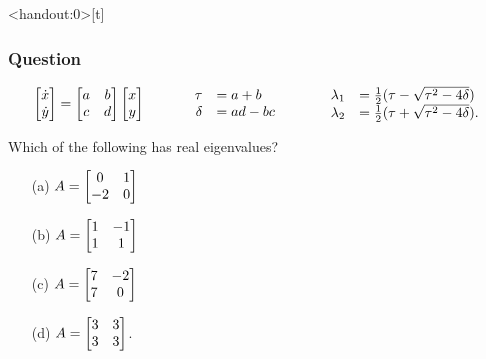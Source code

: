 \documentclass[9pt]{beamer}
\begin{document}
\begin{frame}<handout:0>[t]
 \frametitle{Question}
 \[ \left[\begin{matrix} \dot{x}\\ \dot{y}\end{matrix}\right]=\left[\begin{matrix} a&b\\ c&d\end{matrix}\right]\left[\begin{matrix} x\\ y\end{matrix}\right]
    \hspace{3em}
    \begin{array}{rl}
     \tau &= a+b \\ \delta &= ad-bc
    \end{array}
    \hspace{3em}
    \begin{array}{rl}
     \lambda_1 &= \tfrac{1}{2}(\tau - \sqrt{\tau^2-4\delta}) \\
     \lambda_2 &= \tfrac{1}{2}(\tau + \sqrt{\tau^2-4\delta}).
    \end{array}
 \]

 \reminderbar
 Which of the following has real eigenvalues?
 \begin{itemize}
  \item[(a)] $A=\left[\begin{matrix} 0 & 1\\-2 & 0\end{matrix}\right]$
  \item[(b)] $A=\left[\begin{matrix} 1 &-1\\ 1 & 1\end{matrix}\right]$
  \item[(c)] $A=\left[\begin{matrix} 7 &-2\\ 7 & 0\end{matrix}\right]$
  \item[(d)] $A=\left[\begin{matrix} 3 & 3\\ 3 & 3\end{matrix}\right]$\;\;\;.
 \end{itemize}
\end{frame}
\end{document}
